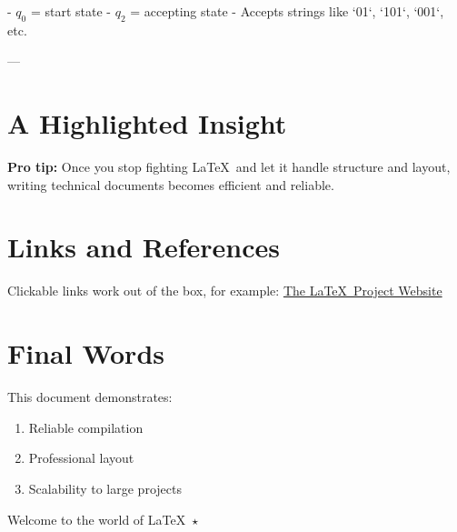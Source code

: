 \documentclass[11pt]{article}
\begin{document}
- $q_0$ = start state  
- $q_2$ = accepting state  
- Accepts strings like `01`, `101`, `001`, etc.

---

\section*{A Highlighted Insight}

\colorbox{softgray}{
\parbox{0.95\textwidth}{
\textbf{Pro tip:}  
Once you stop fighting \LaTeX\ and let it handle structure and layout,  
writing technical documents becomes efficient and reliable.
}}
\vspace{1em}

\section*{Links and References}

Clickable links work out of the box, for example:  
\href{https://www.latex-project.org}{The \LaTeX\ Project Website}

\section*{Final Words}

This document demonstrates:
\begin{enumerate}
    \item Reliable compilation
    \item Professional layout
    \item Scalability to large projects
\end{enumerate}

\begin{center}
    \Large\color{coolblue}
    Welcome to the world of \LaTeX\ $\star$
\end{center}
\end{document}
